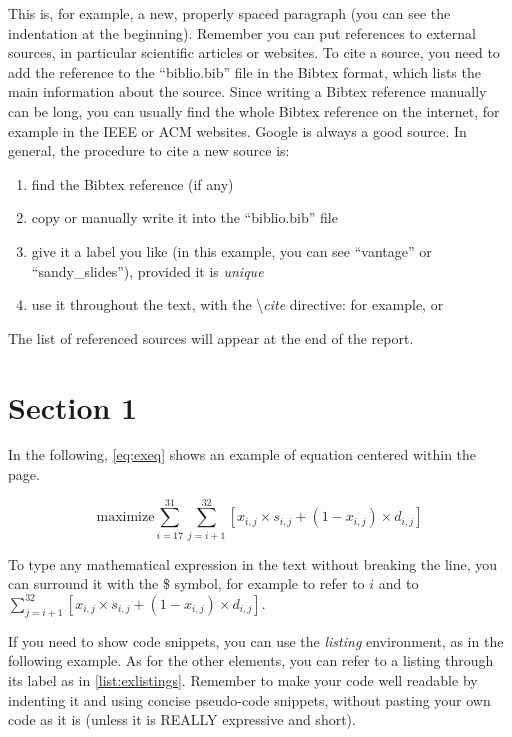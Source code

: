 \documentclass[12pt,oneside,a4paper]{article}
\begin{document}
This is, for example, a new, properly spaced paragraph (you can see the indentation at the beginning). Remember you can put references to external sources, in particular scientific articles or websites. To cite a source, you need to add the reference to the ``biblio.bib'' file in the Bibtex format, which lists the main information about the source. Since writing a Bibtex reference manually can be long, you can usually find the whole Bibtex reference on the internet, for example in the IEEE or ACM websites. Google is always a good source. In general, the procedure to cite a new source is:
\begin{enumerate}
	\item find the Bibtex reference (if any)
	\item copy or manually write it into the ``biblio.bib'' file
	\item give it a label you like (in this example, you can see ``vantage'' or ``sandy\_slides''), provided it is \emph{unique}
	\item use it throughout the text, with the \textbackslash \emph{cite} directive: for example, \cite{vantage} or \cite{sandy_slides}
\end{enumerate}
The list of referenced sources will appear at the end of the report.

\section{Section 1} \label{sec:sec1}
In the following, \cref{eq:exeq} shows an example of equation centered within the page.

\begin{equation}\label{eq:exeq}
%
\mbox{maximize} \sum_{i=17}^{31} \sum_{j=i+1}^{32} [ x_{i,j} \times s_{i,j} + (1 - x_{i,j}) \times d_{i,j} ]
%
\end{equation}

To type any mathematical expression in the text without breaking the line, you can surround it with the \$ symbol, for example to refer to $i$ and to $ \sum_{j=i+1}^{32} [ x_{i,j} \times s_{i,j} + (1 - x_{i,j}) \times d_{i,j} ] $.

If you need to show code snippets, you can use the \emph{listing} environment, as in the following example. As for the other elements, you can refer to a listing through its label as in \cref{list:exlistings}. Remember to make your code well readable by indenting it and using concise pseudo-code snippets, without pasting your own code as it is (unless it is REALLY expressive and short).
\end{document}
